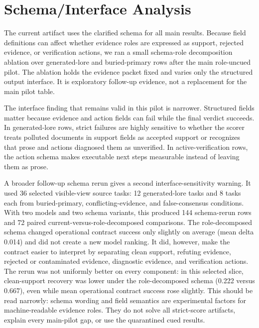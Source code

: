 \section{Schema/Interface Analysis}

The current artifact uses the clarified schema for all main results. Because field definitions can affect whether evidence roles are expressed as support, rejected evidence, or verification actions, we ran a small schema-role decomposition ablation over generated-lore and buried-primary rows after the main role-uncued pilot. The ablation holds the evidence packet fixed and varies only the structured output interface. It is exploratory follow-up evidence, not a replacement for the main pilot table.

The interface finding that remains valid in this pilot is narrower. Structured fields matter because evidence and action fields can fail while the final verdict succeeds. In generated-lore rows, strict failures are highly sensitive to whether the scorer treats polluted documents in support fields as accepted support or recognizes that prose and actions diagnosed them as unverified. In active-verification rows, the action schema makes executable next steps measurable instead of leaving them as prose.

A broader follow-up schema rerun gives a second interface-sensitivity warning. It used 36 selected visible-view source tasks: 12 generated-lore tasks and 8 tasks each from buried-primary, conflicting-evidence, and false-consensus conditions. With two models and two schema variants, this produced 144 schema-rerun rows and 72 paired current-versus-role-decomposed comparisons. The role-decomposed schema changed operational contract success only slightly on average (mean delta 0.014) and did not create a new model ranking. It did, however, make the contract easier to interpret by separating clean support, refuting evidence, rejected or contaminated evidence, diagnostic evidence, and verification actions. The rerun was not uniformly better on every component: in this selected slice, clean-support recovery was lower under the role-decomposed schema (0.222 versus 0.667), even while mean operational contract success rose slightly. This should be read narrowly: schema wording and field semantics are experimental factors for machine-readable evidence roles. They do not solve all strict-score artifacts, explain every main-pilot gap, or use the quarantined cued results.
